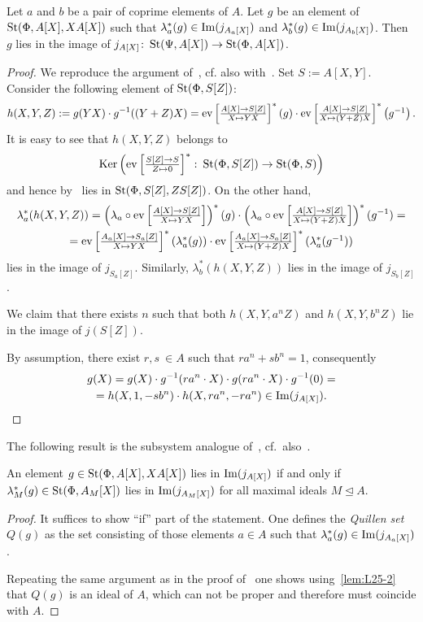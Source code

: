 \begin{lemma}\label{lem:L25-2}
Let $a$ and $b$ be a pair of coprime elements of $A$.
Let $g$ be an element of $\St(\Phi, A[X], XA[X])$ such that
$\lambda_a^*(g) \in \Img(j_{A_a[X]})$ and $\lambda_b^*(g) \in \Img(j_{A_b[X]})$.
Then $g$ lies in the image of $j_{A[X]} \colon \St(\Psi, A[X]) \to \St(\Phi, A[X])$.
\end{lemma}
\begin{proof}
    We reproduce the argument of~\cite[Lemma~2.5]{Tu83}, cf. also with~\cite[Lemma~16]{S15}.
    Set $S := A[X, Y]$.
    Consider the following element of $\St(\Phi, S[Z])$:
    \[h(X, Y, Z) := g(YX) \cdot  g^{-1}((Y+Z) X) = \ev{A}{S[Z]}{YX}^* \left(g\right) \cdot \ev{A}{S[Z]}{(Y + Z)X}^*\left(g^{-1}\right).\]
    It is easy to see that $h(X, Y, Z)$ belongs to
    \[\Ker\left(\eval{Z}{S}{S}{0}^*\colon\St(\Phi, S[Z]) \rightarrow \St(\Phi, S)\right)\]
    and hence by~\cite[Lemma~8]{S15} lies in $\St(\Phi, S[Z], Z S[Z])$.
    On the other hand, \begin{multline*}
                           \lambda_{a}^*(h(X, Y, Z)) = \left(\lambda_a\circ \ev{A}{S[Z]}{Y X}\right)^*(g) \cdot \left(\lambda_a\circ \ev{A}{S[Z]}{(Y + Z)X}\right)^*(g^{-1}) = \\
                           = \ev{A_a}{S_a[Z]}{YX}^*(\lambda_{a}^*(g)) \cdot \ev{A_a}{S_a[Z]}{(Y + Z)X}^*(\lambda_{a}^*(g^{-1})) \end{multline*}
    lies in the image of $j_{S_a[Z]}$.
    Similarly, $\lambda_{b}^*(h(X, Y, Z))$ lies in the image of $j_{S_b[Z]}$.

    We claim that there exists $n$ such that both $h(X, Y, a^n Z)$ and $h(X, Y, b^n Z)$
    lie in the image of $j(S[Z])$.

    By assumption, there exist $r, s\ \in A$ such that $r a^n + s b^n = 1$, consequently
    \begin{multline*}
        g(X) = g(X)\cdot g^{-1}(ra^n\cdot X) \cdot g(ra^n\cdot X) \cdot g^{-1}(0) = \\
         = h(X, 1, -sb^n) \cdot h(X, ra^n, -ra^n) \in \mathrm{Im}(j_{A[X]}). \qedhere
    \end{multline*} \end{proof}

The following result is the subsystem analogue of~\cite[Theorem~2]{LS17}, cf.\ also~\cite[Theorem~2.1]{Tu83}.
\begin{cor} \label{cor:QS-subsystem}
    An element $g \in \St(\Phi, A[X], XA[X])$ lies in $\Img(j_{A[X]})$ if and only if
     $\lambda_M^*(g) \in \St(\Phi, A_M[X])$ lies in $\Img(j_{A_M[X]})$ for all maximal ideals $M \trianglelefteq A$.
\end{cor}
\begin{proof}
    It suffices to show ``if'' part of the statement.
    One defines the \textit{Quillen set} $Q(g)$ as the set consisting of those elements $a \in A$
    such that $\lambda_a^*(g) \in \Img(j_{A_a[X]})$.

    Repeating the same argument as in the proof of~\cite[Theorem~2]{S15} one shows using~\cref{lem:L25-2}
     that $Q(g)$ is an ideal of $A$, which can not be proper and therefore must coincide with $A$.
\end{proof}

